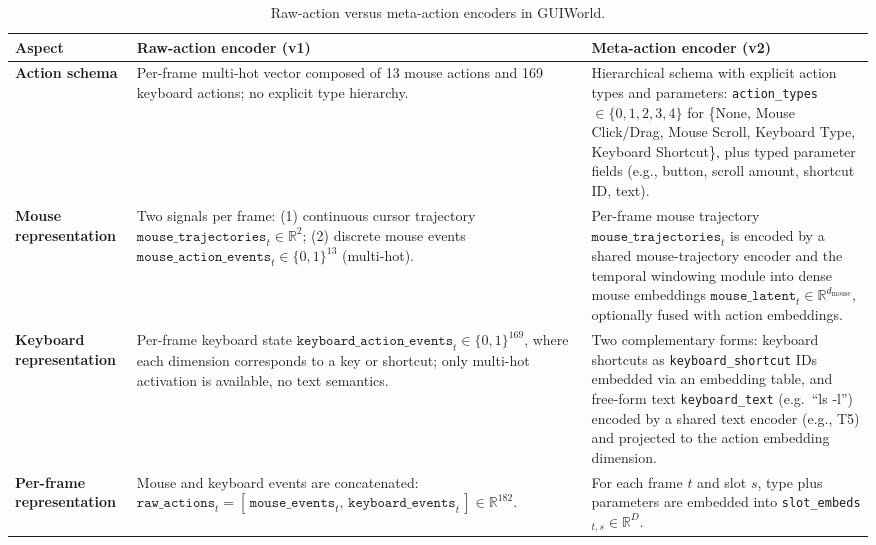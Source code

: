 \begin{table}[h!]
  \centering
  \small
  \setlength{\tabcolsep}{4pt}
  \renewcommand{\arraystretch}{1.12}
  \caption{Raw-action versus meta-action encoders in GUIWorld.}
  \label{tab:action-encoder-comparison}
  \begin{tabularx}{\linewidth}{p{2.9cm} >{\raggedright\arraybackslash}X >{\raggedright\arraybackslash}X}
    \toprule
    \textbf{Aspect} &
    \textbf{Raw-action encoder (v1)} &
    \textbf{Meta-action encoder (v2)} \\
    \midrule
    \textbf{Action schema} &
    Per-frame multi-hot vector composed of
    13 mouse actions and 169 keyboard actions;
    no explicit type hierarchy. &
    Hierarchical schema with explicit action types and parameters:
    \texttt{action\_types} $\in \{0,1,2,3,4\}$ for
    \{None, Mouse Click/Drag, Mouse Scroll, Keyboard Type, Keyboard Shortcut\},
    plus typed parameter fields (e.g., button, scroll amount, shortcut ID, text). \\[2pt]
    \textbf{Mouse representation} &
    Two signals per frame:
    (1) continuous cursor trajectory
    $\texttt{mouse\_trajectories}_{t} \in \mathbb{R}^2$;
    (2) discrete mouse events
    $\texttt{mouse\_action\_events}_{t} \in \{0,1\}^{13}$ (multi-hot). &
    Per-frame mouse trajectory
    $\texttt{mouse\_trajectories}_{t}$
    is encoded by a shared mouse-trajectory encoder and the temporal windowing module into
    dense mouse embeddings
    $\texttt{mouse\_latent}_{t} \in \mathbb{R}^{d_{\text{mouse}}}$,
    optionally fused with action embeddings. \\[2pt]
    \textbf{Keyboard representation} &
    Per-frame keyboard state
    $\texttt{keyboard\_action\_events}_{t} \in \{0,1\}^{169}$,
    where each dimension corresponds to a key or shortcut;
    only multi-hot activation is available, no text semantics. &
    Two complementary forms:
    keyboard shortcuts as
    \texttt{keyboard\_shortcut} IDs embedded via an embedding table, and
    free-form text \texttt{keyboard\_text} (e.g.\ ``ls -l'')
    encoded by a shared text encoder (e.g., T5) and projected to the
    action embedding dimension. \\[2pt]
    \textbf{Per-frame representation} &
    Mouse and keyboard events are concatenated:
    $\texttt{raw\_actions}_{t}
      = [\,\texttt{mouse\_events}_{t},\,
           \texttt{keyboard\_events}_{t}\,]
      \in \mathbb{R}^{182}$. &
    For each frame $t$ and slot $s$,
    type plus parameters are embedded into
    \texttt{slot\_embeds}$_{t,s} \in \mathbb{R}^{D}$.

\end{tabularx}
\end{table}
